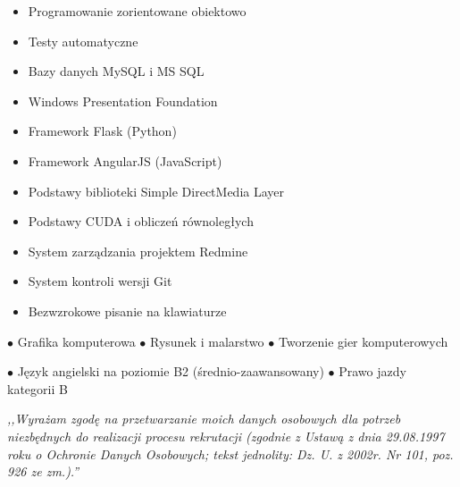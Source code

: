 \documentclass[11pt,a4paper]{article}
\begin{document}
    \newpage
  

    \begin{itemize} \itemsep2pt \parskip0pt 
        \item Programowanie zorientowane obiektowo
        \item Testy automatyczne
        \item Bazy danych MySQL i MS SQL
        \item Windows Presentation Foundation
        \item Framework Flask (Python)
        \item Framework AngularJS (JavaScript)
        \item Podstawy biblioteki Simple DirectMedia Layer
        \item Podstawy CUDA i obliczeń równoległych
        \item System zarządzania projektem Redmine
        \item System kontroli wersji Git
        \item Bezwzrokowe pisanie na klawiaturze
    \end{itemize}
  
  
    \vspace{0.3cm}
  
    \medskip
    \centerline{
        \hfill
        $\bullet$ Grafika komputerowa
        \hfill
        $\bullet$ Rysunek i malarstwo
        \hfill
        $\bullet$ Tworzenie gier komputerowych
        \hfill
    }
  
  
    \vspace{0.5cm}
  
    \medskip
    \centerline{
        \hfill
        $\bullet$ Język angielski na poziomie B2 (średnio-zaawansowany)
        \hfill
        $\bullet$ Prawo jazdy kategorii B
        \hfill
    }
  
  
    \vspace{0.92cm}
    \noindent \textit{,,Wyrażam zgodę na przetwarzanie moich danych osobowych dla potrzeb
    niezbędnych do realizacji procesu rekrutacji (zgodnie z Ustawą z dnia 29.08.1997 roku o Ochronie
    Danych Osobowych; tekst jednolity: Dz. U. z 2002r. Nr 101, poz. 926 ze zm.).''}
\end{document}
